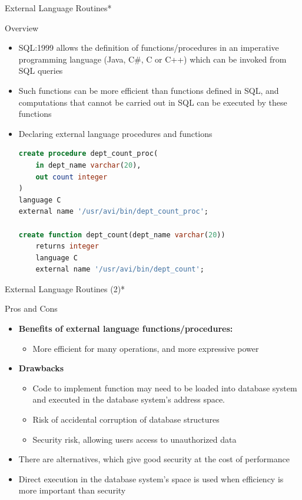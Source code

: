\documentclass[aspectratio=169, xcolor=dvipsnames]{beamer}
\begin{document}
\begin{frame}[fragile]{External Language Routines*}
    \begin{block}{Overview}
        \begin{itemize}[<+->]
            \item SQL:1999 allows the definition of functions/procedures in an imperative programming language (Java, C$\#$, C or C++) which can be invoked from SQL queries
            \item Such functions can be more efficient than functions defined in SQL, and computations that cannot be carried out in SQL can be executed by these functions
            \item Declaring external language procedures and functions
            \begin{lstlisting}[language=SQL, basicstyle=\ttfamily\scriptsize]
create procedure dept_count_proc(
    in dept_name varchar(20), 
    out count integer
) 
language C
external name '/usr/avi/bin/dept_count_proc';

create function dept_count(dept_name varchar(20))
    returns integer 
    language C
    external name '/usr/avi/bin/dept_count';
            \end{lstlisting}
        \end{itemize}
    \end{block}
\end{frame}

\begin{frame}{External Language Routines (2)*}
    \begin{block}{Pros and Cons}
        \begin{itemize}[<+->]
            \item \textbf{Benefits of external language functions/procedures:}
            \begin{itemize}
                \item[$\triangleright$] More efficient for many operations, and more expressive power
            \end{itemize}
            \item \textbf{Drawbacks}
            \begin{itemize}
                \item[$\triangleright$] Code to implement function may need to be loaded into database system and executed in the database system's address space.
                \item[$\triangleright$] Risk of accidental corruption of database structures
                \item[$\triangleright$] Security risk, allowing users access to unauthorized data
            \end{itemize}
            \item There are alternatives, which give good security at the cost of performance
            \item Direct execution in the database system's space is used when efficiency is more important than security
        \end{itemize}
    \end{block}
\end{frame}
\end{document}
